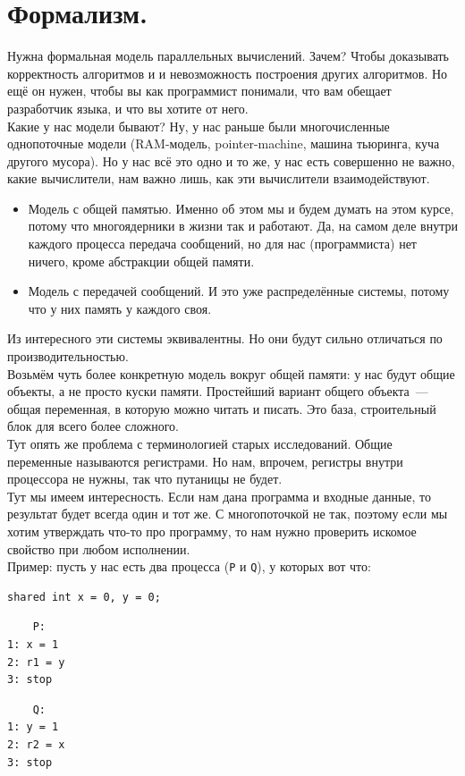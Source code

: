 \documentclass{article}
\begin{document}
\section{Формализм.}
Нужна формальная модель параллельных вычислений. Зачем? Чтобы доказывать корректность алгоритмов и и невозможность построения других алгоритмов. Но ещё он нужен, чтобы вы как программист понимали, что вам обещает разработчик языка, и что вы хотите от него.\\
Какие у нас модели бывают? Ну, у нас раньше были многочисленные однопоточные модели (RAM-модель, pointer-machine, машина тьюринга, куча другого мусора). Но у нас всё это одно и то же, у нас есть совершенно не важно, какие вычислители, нам важно лишь, как эти вычислители взаимодействуют.
\begin{itemize}
    \item Модель с общей памятью. Именно об этом мы и будем думать на этом курсе, потому что многоядерники в жизни так и работают. Да, на самом деле внутри каждого процесса передача сообщений, но для нас (программиста) нет ничего, кроме абстракции общей памяти.
    \item Модель с передачей сообщений. И это уже распределённые системы, потому что у них память у каждого своя.
\end{itemize}
Из интересного эти системы эквивалентны. Но они будут сильно отличаться по производительностью.\\
Возьмём чуть более конкретную модель вокруг общей памяти: у нас будут общие объекты, а не просто куски памяти. Простейший вариант общего объекта~--- общая переменная, в которую можно читать и писать. Это база, строительный блок для всего более сложного.\\
Тут опять же проблема с терминологией старых исследований. Общие переменные называются регистрами. Но нам, впрочем, регистры внутри процессора не нужны, так что путаницы не будет.\\
Тут мы имеем интересность. Если нам дана программа и входные данные, то результат будет всегда один и тот же. С многопоточкой не так, поэтому если мы хотим утверждать что-то про программу, то нам нужно проверить искомое свойство при любом исполнении.\\
Пример: пусть у нас есть два процесса (\Verb|P| и \Verb|Q|), у которых вот что:
\begin{verbatim}
shared int x = 0, y = 0;
    \end{verbatim}
\begin{multicols}{2}
\begin{verbatim}
    P:
1: x = 1
2: r1 = y
3: stop
\end{verbatim}
\columnbreak
\begin{verbatim}
    Q:
1: y = 1
2: r2 = x
3: stop
\end{verbatim}
\end{multicols}
\end{document}
